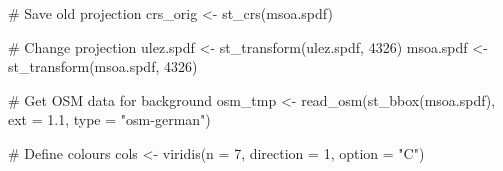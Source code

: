 \documentclass[
  letterpaper,
  DIV=11,
  numbers=noendperiod]{scrreprt}
\newenvironment{Shaded}{\begin{snugshade}}{\end{snugshade}}
\newcommand{\AttributeTok}[1]{\textcolor[rgb]{0.40,0.45,0.13}{#1}}
\newcommand{\CommentTok}[1]{\textcolor[rgb]{0.37,0.37,0.37}{#1}}
\newcommand{\DecValTok}[1]{\textcolor[rgb]{0.68,0.00,0.00}{#1}}
\newcommand{\FloatTok}[1]{\textcolor[rgb]{0.68,0.00,0.00}{#1}}
\newcommand{\FunctionTok}[1]{\textcolor[rgb]{0.28,0.35,0.67}{#1}}
\newcommand{\NormalTok}[1]{\textcolor[rgb]{0.00,0.23,0.31}{#1}}
\newcommand{\OtherTok}[1]{\textcolor[rgb]{0.00,0.23,0.31}{#1}}
\newcommand{\StringTok}[1]{\textcolor[rgb]{0.13,0.47,0.30}{#1}}
\begin{document}
\begin{Shaded}
\begin{Highlighting}[]
\CommentTok{\# Save old projection}
\NormalTok{crs\_orig }\OtherTok{\textless{}{-}} \FunctionTok{st\_crs}\NormalTok{(msoa.spdf)}

\CommentTok{\# Change projection}
\NormalTok{ulez.spdf }\OtherTok{\textless{}{-}} \FunctionTok{st\_transform}\NormalTok{(ulez.spdf, }\DecValTok{4326}\NormalTok{)}
\NormalTok{msoa.spdf }\OtherTok{\textless{}{-}} \FunctionTok{st\_transform}\NormalTok{(msoa.spdf, }\DecValTok{4326}\NormalTok{)}

\CommentTok{\# Get OSM data for background}
\NormalTok{osm\_tmp }\OtherTok{\textless{}{-}} \FunctionTok{read\_osm}\NormalTok{(}\FunctionTok{st\_bbox}\NormalTok{(msoa.spdf), }\AttributeTok{ext =} \FloatTok{1.1}\NormalTok{, }\AttributeTok{type =} \StringTok{"osm{-}german"}\NormalTok{) }

\CommentTok{\# Define colours}
\NormalTok{cols }\OtherTok{\textless{}{-}} \FunctionTok{viridis}\NormalTok{(}\AttributeTok{n =} \DecValTok{7}\NormalTok{, }\AttributeTok{direction =} \DecValTok{1}\NormalTok{, }\AttributeTok{option =} \StringTok{"C"}\NormalTok{)}


\end{Highlighting}
\end{Shaded}
\end{document}
